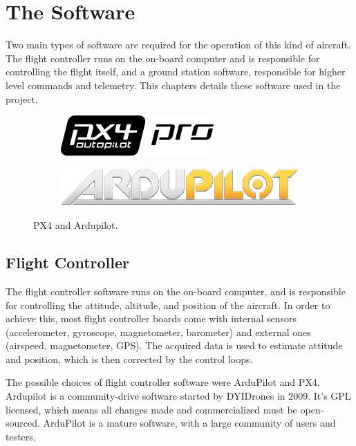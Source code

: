 \chapter{The Software}

Two main types of software are required for the operation of this kind of aircraft. The flight controller runs on the on-board computer and is responsible for controlling the flight itself, and a ground station software, responsible for higher level commands and telemetry.
This chapters details these software used in the project.

\begin{figure}[h]
  \centering
  \begin{subfigure}{.5\textwidth}
    \centering
    \includegraphics[width=\linewidth]{figs/px4.png}
  \end{subfigure}%
  \begin{subfigure}{.5\textwidth}
    \centering
    \includegraphics[width=\linewidth]{figs/ardupilot.png}

  \end{subfigure}
  \caption{PX4 and Ardupilot.}
  \label{fig:motorcurves}
\end{figure}


\section{Flight Controller}
The flight controller software runs on the on-board computer, and is responsible for controlling the attitude, altitude, and position of the aircraft.
%
In order to achieve this, most flight controller boards come with internal sensors (accelerometer, gyroscope, magnetometer, barometer) and external ones (airspeed, magnetometer, GPS). 
%
The acquired data is used to estimate attitude and position, which is then corrected by the control loops.

The possible choices of flight controller software were ArduPilot and PX4.
%
Ardupilot is a community-drive software started by DYIDrones in 2009\cite{dyidrones}.
%
It's GPL licensed, which means all changes made and commercialized must be open-sourced\cite{gplv3}.
%
ArduPilot is a mature software, with a large community of users and testers.
%


